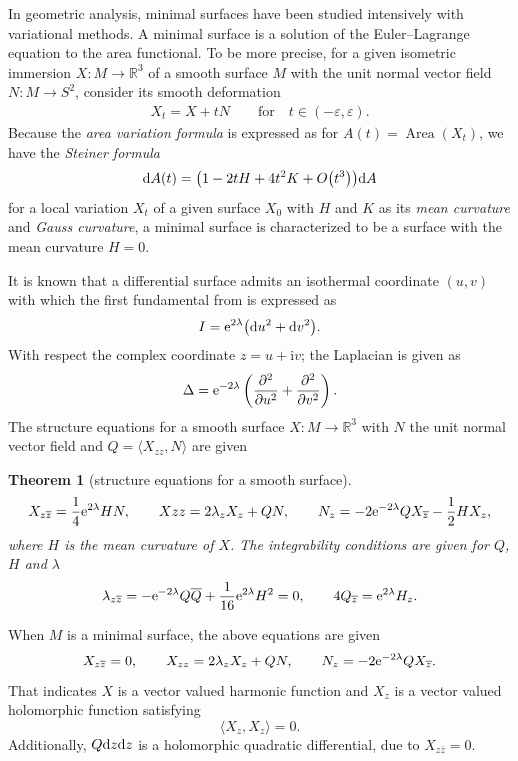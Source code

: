 \documentclass[10pt,a4paper]{amsart}
\newcommand{\R}{\mathbb{R}}
\newcommand{\ii}{{\mathrm{i}}}
\renewcommand{\epsilon}{\varepsilon}
\DeclareMathOperator{\Area}{Area}
\newcommand{\1}{{\bf 1}}
\newcommand{\pd}{\partial}
\newcommand{\nai}{\langle}
\newcommand{\seki}{\rangle}
\numberwithin{equation}{section}
\newtheorem{Theorem}{Theorem}[section]
\begin{document}
In geometric analysis,
minimal surfaces have been studied intensively with variational methods.
A minimal surface is a solution of the Euler--Lagrange equation to the area functional.
To be more precise,
for a given isometric immersion $X\colon M \to \R^3$ of a smooth surface $M$ with the unit normal vector field $N\colon M \to S^2$,
consider its smooth deformation
\begin{gather*}
 X_t = X +tN \qquad \text{for}\quad t \in (-\epsilon, \epsilon).
\end{gather*}
Because the {\em area variation formula} is expressed as for $A(t)= \Area(X_t)$, we have the {\em Steiner formula}\label{steinerformula}
\begin{gather*}
 {\rm d}A(t) = \big(1 -2tH+ 4t^2 K +O\big(t^3\big)\big){\rm d}A
\end{gather*}
for a local variation $X_t$ of a given surface $X_0$ with $H$ and $K$ as
its {\em mean curvature} and {\em Gauss curvature}, a minimal surface is characterized to be a surface with the mean curvature $H =0$.

It is known that a differential surface admits an isothermal coordinate $(u,v)$ with which the first fundamental from is expressed as
\begin{gather*}
 I ={\rm e}^{2\lambda}\big({\rm d}u^2+ {\rm d}v^2\big).
\end{gather*}
With respect the complex coordinate $z=u+\ii v$; the Laplacian is given as
\begin{gather*}
 \Delta = {\rm e}^{-2\lambda} \left( \frac{\pd^2}{\pd u^2} + \frac{\pd^2}{\pd v^2}\right).
\end{gather*}
The structure equations for a smooth surface $X\colon M \to \R^3$ with $N$ the unit normal vector field
and $Q = \nai X_{zz}, N \seki$ are given
\begin{Theorem}[structure equations for a smooth surface]
 \[
 X_{z \overline{z}}= \frac{1}{4} {\rm e}^{2\lambda}H N, \qquad
 X{zz} = 2 \lambda_{z}X_z + QN, \qquad
 N_z = -2 {\rm e}^{-2\lambda}Q X_{\overline{z}} - \frac{1}{2} HX_z,
 \]
 where $H$ is the mean curvature of $X$.
 The integrability conditions are given for $Q$, $H$ and $\lambda$
 \[
 \lambda_{z\overline{z}}=-{\rm e}^{-2\lambda} Q \overline{Q} + \frac{1}{16} {\rm e}^{2\lambda}H^2 =0, \qquad
 4Q_{\overline{z}} = {\rm e}^{2\lambda} H_z.
 \]
\end{Theorem}
When $M$ is a minimal surface, the above equations are given
\[
 X_{z\overline{z}}=0,\qquad
 X_{zz} = 2\lambda_z X_z + QN,\qquad
 N_z = -2{\rm e}^{-2\lambda}Q X_{\overline{z}}.
\]
That indicates $X$ is a vector valued harmonic function and
$X_z$ is a vector valued holomorphic function satisfying
\begin{displaymath}
 \nai X_z, X_z \seki = 0.
\end{displaymath}
Additionally, $Q{\rm d}z{\rm d}z$ is a holomorphic quadratic differential,
due to $X_{z\overline{z}}=0$.
\end{document}
